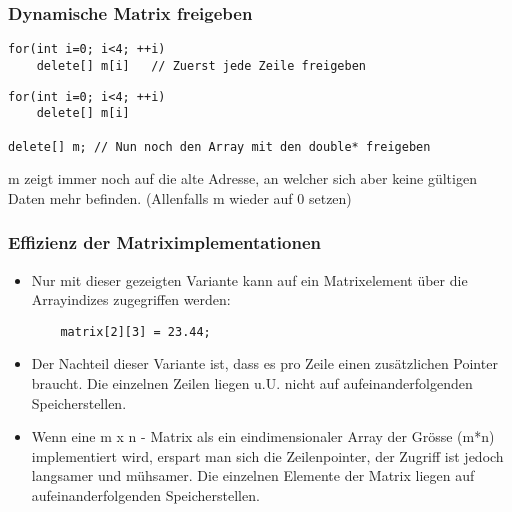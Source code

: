 \subsubsection{Dynamische Matrix freigeben\hfill}
\label{sec:unterunterabschnitt}
\noindent
\begin{minipage}{\linewidth}
\begin{lstlisting}
for(int i=0; i<4; ++i)
	delete[] m[i]	// Zuerst jede Zeile freigeben		
\end{lstlisting}
\end{minipage}


\noindent
\begin{minipage}{\linewidth}
\begin{lstlisting}
for(int i=0; i<4; ++i)
	delete[] m[i]

delete[] m;	// Nun noch den Array mit den double* freigeben
\end{lstlisting}
\end{minipage}


\begin{achtung}
m zeigt immer noch auf die alte Adresse, an welcher sich aber keine gültigen Daten mehr befinden. (Allenfalls m wieder auf 0 setzen)
\end{achtung}

\subsubsection{Effizienz der Matriximplementationen\hfill}
\label{sec:unterunterabschnitt}
\begin{itemize}
	\item Nur mit dieser gezeigten Variante kann auf ein Matrixelement über die Arrayindizes zugegriffen werden:
	\begin{minipage}{\linewidth}
	\begin{lstlisting}
	matrix[2][3] = 23.44;
	\end{lstlisting}
	\end{minipage}
	\item Der Nachteil dieser Variante ist, dass es pro Zeile einen zusätzlichen Pointer braucht. Die einzelnen Zeilen liegen u.U. nicht auf aufeinanderfolgenden Speicherstellen.
	\item Wenn eine m x n - Matrix als ein eindimensionaler Array der Grösse (m*n) implementiert wird, erspart man sich die Zeilenpointer, der Zugriff ist jedoch langsamer und mühsamer. Die einzelnen Elemente der Matrix liegen auf aufeinanderfolgenden Speicherstellen.
\end{itemize}

